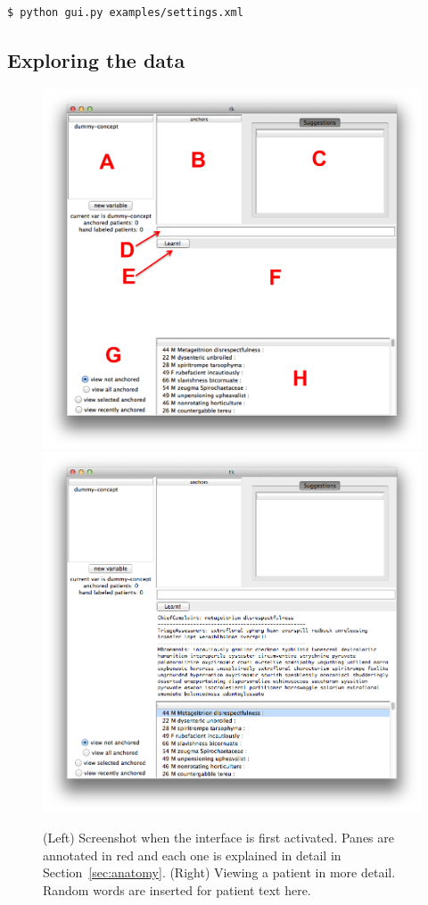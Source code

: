 \documentclass[12pt]{article}
\begin{document}
\begin{verbatim}
$ python gui.py examples/settings.xml
\end{verbatim}

\subsection{Exploring the data}
\begin{figure}[tb]
    \begin{center}
        \includegraphics[scale=0.40]{screen_2_annotated.png}
        \includegraphics[scale=0.25]{screen_3.png}
    \end{center}
    \caption{\label{fig:first_activation} (Left) Screenshot when the interface is first activated. Panes are annotated in red and each one is explained in detail in Section~\ref{sec:anatomy}. (Right) Viewing a patient in more detail. Random words are inserted for patient text here.}
\end{figure}
\end{document}
